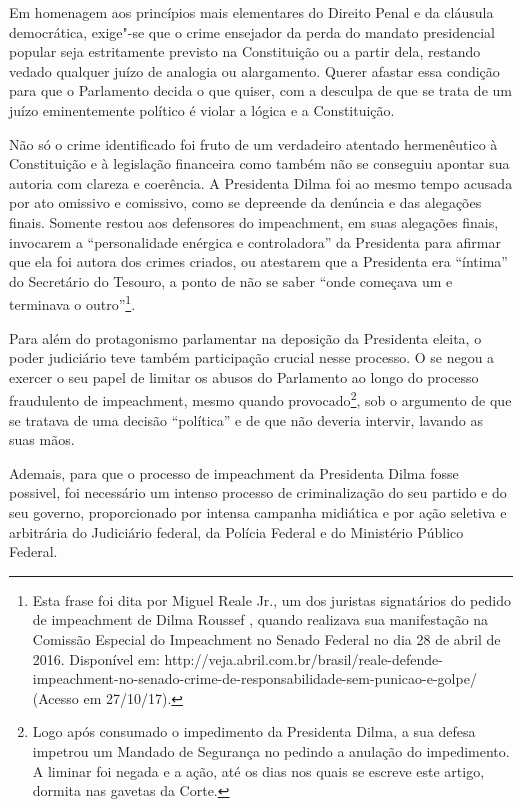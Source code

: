 Em homenagem aos princípios mais elementares do Direito Penal e da
cláusula democrática, exige"-se que o crime ensejador da perda do mandato
presidencial popular seja estritamente previsto na Constituição ou a
partir dela, restando vedado qualquer juízo de analogia ou alargamento.
Querer afastar essa condição para que o Parlamento decida o que quiser,
com a desculpa de que se trata de um juízo eminentemente político é
violar a lógica e a Constituição.

Não só o crime identificado foi fruto de um verdadeiro atentado
hermenêutico à Constituição e à legislação financeira como também não se
conseguiu apontar sua autoria com clareza e coerência. A Presidenta
Dilma foi ao mesmo tempo acusada por ato omissivo e comissivo, como se
depreende da denúncia e das alegações finais. Somente restou aos
defensores do impeachment, em suas alegações finais, invocarem a
``personalidade enérgica e controladora'' da Presidenta para afirmar que
ela foi autora dos crimes criados, ou atestarem que a Presidenta era
``íntima'' do Secretário do Tesouro, a ponto de não se saber ``onde
começava um e terminava o outro''\footnote{Esta frase foi dita por Miguel
  Reale Jr., um dos juristas signatários do pedido de impeachment de
  Dilma Roussef , quando realizava sua manifestação na Comissão Especial
  do Impeachment no Senado Federal no dia 28 de abril de 2016.
  Disponível em:
  http://veja.abril.com.br/brasil/reale-defende-impeachment-no-senado-crime-de-responsabilidade-sem-punicao-e-golpe/
  (Acesso em 27/10/17).}.

Para além do protagonismo parlamentar na deposição da Presidenta eleita,
o poder judiciário teve também participação crucial nesse processo. O
 se negou a exercer o seu papel de limitar os abusos do Parlamento ao
longo do processo fraudulento de impeachment, mesmo quando
provocado\footnote{Logo após consumado o impedimento da Presidenta
  Dilma, a sua defesa impetrou um Mandado de Segurança no  pedindo a
  anulação do impedimento. A liminar foi negada e a ação, até os dias
  nos quais se escreve este artigo, dormita nas gavetas da Corte.}, sob
o argumento de que se tratava de uma decisão ``política'' e de que não
deveria intervir, lavando as suas mãos.

Ademais, para que o processo de impeachment da Presidenta Dilma fosse
possivel, foi necessário um intenso processo de criminalização do seu
partido e do seu governo, proporcionado por intensa campanha midiática e
por ação seletiva e arbitrária do Judiciário federal, da Polícia Federal
e do Ministério Público Federal.

